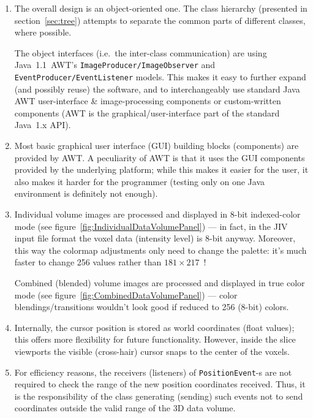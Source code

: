\documentclass[11pt]{article}
\begin{document}
\begin{enumerate}
\item The overall design is an object-oriented one. The class
  hierarchy (presented in section~\ref{sec:tree}) attempts to separate
  the common parts of different classes, where possible.
  
  The object interfaces (i.e.\ the inter-class communication) are
  using Java~1.1~AWT's \linebreak \texttt{ImageProducer/ImageObserver}
  and \texttt{EventProducer/EventListener} models.  This makes it easy
  to further expand (and possibly reuse) the software, and to
  interchangeably use \mbox{standard} Java AWT user-interface \&
  image-processing components or custom-written components (AWT is the
  graphical/user-interface part of the standard Java~1.x API).
  
\item Most basic graphical user interface (GUI) building blocks
  (components) are provided by AWT\@.  
  A peculiarity of AWT is that it uses the GUI components provided by
  the underlying platform; while this makes it easier for the user, it
  also makes it harder for the programmer (testing only on one Java
  environment is definitely not enough).

\item Individual volume images are processed and displayed in 8-bit
  indexed-color mode (see figure~\ref{fig:IndividualDataVolumePanel})
  --- in fact, in the JIV input file format the voxel data (intensity
  level) is 8-bit anyway. Moreover, this way the colormap adjustments
  only need to change the palette: it's much faster to change 256
  values rather than $181 \times 217$~!
  
  Combined (blended) volume images are processed and displayed in true
  color mode (see figure~\ref{fig:CombinedDataVolumePanel}) --- color
  blendings/transitions wouldn't look good if reduced to 256 (8-bit)
  colors.

\item Internally, the cursor position is stored as world coordinates
  (float values); this offers more flexibility for future functionality.
  However, inside the slice viewports the visible (cross-hair) cursor
  snaps to the center of the voxels.
  
\item For efficiency reasons, the receivers (listeners) of
  \texttt{PositionEvent}-s are not required to check the range of the
  new position coordinates received.  Thus, it is the responsibility
  of the class generating (sending) such events not to send
  coordinates outside the valid range of the 3D data volume.
  

\end{enumerate}
\end{document}
